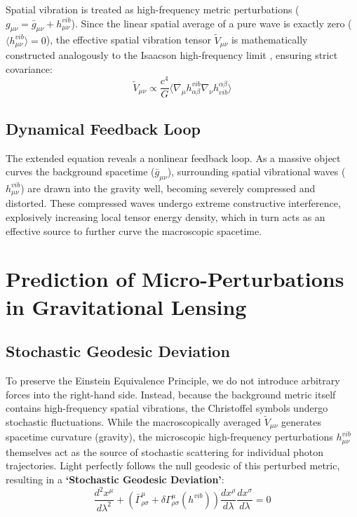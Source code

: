 \documentclass[reprint,amsmath,amssymb,aps,prd]{revtex4-2}
\begin{document}
Spatial vibration is treated as high-frequency metric perturbations ($g_{\mu\nu} = \bar{g}_{\mu\nu} + h_{\mu\nu}^{vib}$). Since the linear spatial average of a pure wave is exactly zero ($\langle h_{\mu\nu}^{vib} \rangle = 0$), the effective spatial vibration tensor $\tilde{V}_{\mu\nu}$ is mathematically constructed analogously to the Isaacson high-frequency limit \cite{Isaacson1968}, ensuring strict covariance:
\begin{equation}
\tilde{V}_{\mu\nu} \propto \frac{c^4}{G} \langle \nabla_\mu h_{\alpha\beta}^{vib} \nabla_\nu h^{\alpha\beta}_{vib} \rangle
\end{equation}

\subsection{Dynamical Feedback Loop}
The extended equation reveals a nonlinear feedback loop. As a massive object curves the background spacetime ($\bar{g}_{\mu\nu}$), surrounding spatial vibrational waves ($h_{\mu\nu}^{vib}$) are drawn into the gravity well, becoming severely compressed and distorted. These compressed waves undergo extreme constructive interference, explosively increasing local tensor energy density, which in turn acts as an effective source to further curve the macroscopic spacetime.

\section{Prediction of Micro-Perturbations in Gravitational Lensing}

\subsection{Stochastic Geodesic Deviation}
To preserve the Einstein Equivalence Principle, we do not introduce arbitrary forces into the right-hand side. Instead, because the background metric itself contains high-frequency spatial vibrations, the Christoffel symbols undergo stochastic fluctuations. While the macroscopically averaged $\tilde{V}_{\mu\nu}$ generates spacetime curvature (gravity), the microscopic high-frequency perturbations $h_{\mu\nu}^{vib}$ themselves act as the source of stochastic scattering for individual photon trajectories. Light perfectly follows the null geodesic of this perturbed metric, resulting in a \textbf{`Stochastic Geodesic Deviation'}:
\begin{equation}
\frac{d^2 x^\mu}{d\lambda^2} + \left( \bar{\Gamma}^\mu_{\rho\sigma} + \delta \Gamma^\mu_{\rho\sigma}(h^{vib}) \right) \frac{dx^\rho}{d\lambda} \frac{dx^\sigma}{d\lambda} = 0
\end{equation}
\end{document}
